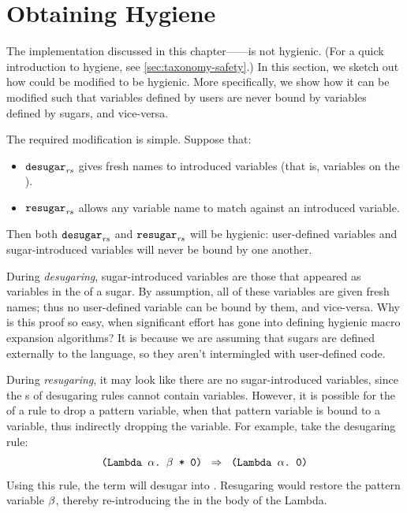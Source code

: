 \section{Obtaining Hygiene}
\label{sec:reval-hygiene}

The implementation discussed in this chapter---{\Resugarer}---is not
hygienic. (For a quick introduction to hygiene, see
\cref{sec:taxonomy-safety}.) In this section, we sketch out how {\Resugarer}
could be modified to be hygienic. More specifically, we show how it
can be modified such that variables defined by users are never bound
by variables defined by sugars, and vice-versa.

The required modification is simple. Suppose that:
\begin{itemize}[noitemsep]
  \item $\textnormal{\texttt{desugar}}_{\mathit{rs}}$ gives fresh names to introduced variables (that
    is, variables on the ).
  \item $\textnormal{\texttt{resugar}}_{\mathit{rs}}$ allows any variable name to match against an
    introduced variable.
\end{itemize}
Then both $\textnormal{\texttt{desugar}}_{\mathit{rs}}$ and $\textnormal{\texttt{resugar}}_{\mathit{rs}}$ will be hygienic:
user-defined variables and sugar-introduced variables will never be
bound by one another.

During \emph{desugaring}, sugar-introduced variables are those that
appeared as variables in the  of a sugar. By assumption, all
of these variables are given fresh names; thus no user-defined
variable can be bound by them, and vice-versa. Why is this proof so
easy, when significant effort has gone into defining hygienic macro
expansion algorithms? It is because we are assuming that sugars are
defined externally to the language, so they aren't intermingled with
user-defined code.

During \emph{resugaring}, it may look like there are no
sugar-introduced variables, since the s of desugaring rules
cannot contain variables. However, it is possible for the  of
a rule to drop a pattern variable, when that pattern variable is bound
to a variable, thus indirectly dropping the variable. For example,
take the desugaring rule:
\[\DesugarRule{(Lambda $\PVarA$.\ $\PVarB$ * 0)}{(Lambda $\PVarA$.\ 0)}\]
Using this rule, the term  will desugar into
. Resugaring would restore the pattern
variable $\beta$, thereby re-introducing the  in the body of
the Lambda.

